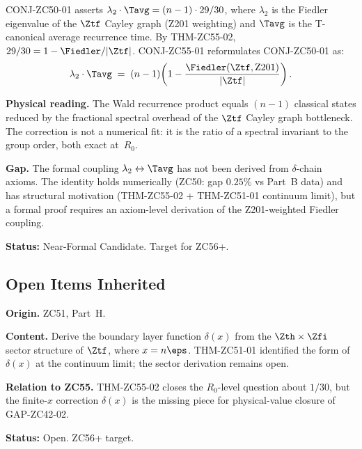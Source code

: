 \documentclass[12pt, a4paper]{article}
\begin{document}
\begin{derivedbox}[title={CONJ-ZC55-01: Structural Wald Correction
  Identity (Near-Formal Candidate, $R_0$)}]
CONJ-ZC50-01 asserts $\lambda_2\cdot\Tavg=(n-1)\cdot29/30$,
where $\lambda_2$ is the Fiedler eigenvalue of the $\Ztf$ Cayley
graph (Z201 weighting) and $\Tavg$ is the T-canonical average
recurrence time.
By THM-ZC55-02, $29/30=1-\Fiedler/|\Ztf|$.
CONJ-ZC55-01 reformulates CONJ-ZC50-01 as:
\begin{equation}
  \lambda_2\cdot\Tavg
  \;=\;(n-1)\!\left(1-\frac{\Fiedler(\Ztf,\mathrm{Z201})}{|\Ztf|}\right).
  \label{eq:structural-wald}
\end{equation}

\textbf{Physical reading.}
The Wald recurrence product equals $(n-1)$ classical states
reduced by the fractional spectral overhead of the $\Ztf$
Cayley graph bottleneck.  The correction is not a numerical fit:
it is the ratio of a spectral invariant to the group order,
both exact at~$R_0$.

\textbf{Gap.}
The formal coupling $\lambda_2\leftrightarrow\Tavg$ has not been
derived from $\delta$-chain axioms.  The identity holds
numerically (ZC50: gap $0.25\%$ vs Part~B data) and has structural
motivation (THM-ZC55-02 + THM-ZC51-01 continuum limit), but a
formal proof requires an axiom-level derivation of the Z201-weighted
Fiedler coupling.

\textbf{Status:} Near-Formal Candidate.  Target for ZC56+.
\end{derivedbox}

\subsection{Open Items Inherited}

\begin{openqbox}[title={GAP-ZC51-01: Born-chain Boundary Layer
  (Inherited Open)}]
\textbf{Origin.} ZC51, Part~H.

\textbf{Content.}
Derive the boundary layer function $\delta(x)$ from the
$\Zth\times\Zfi$ sector structure of $\Ztf$, where $x=n\eps$.
THM-ZC51-01 identified the form of $\delta(x)$ at the continuum
limit; the sector derivation remains open.

\textbf{Relation to ZC55.}
THM-ZC55-02 closes the $R_0$-level question about $1/30$, but the
finite-$x$ correction $\delta(x)$ is the missing piece for
physical-value closure of GAP-ZC42-02.

\textbf{Status:} Open.  ZC56+ target.
\end{openqbox}
\end{document}
